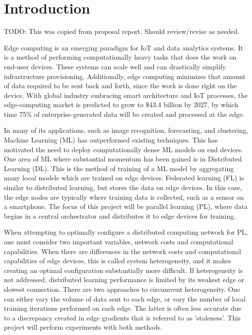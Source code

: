 \documentclass[../mthe-493-final-project.tex]{subfiles}
\begin{document}
    \chapter{Introduction}
    \label{ch:introduction}

    TODO: This was copied from proposal report. Should review/revise as needed.

    Edge computing is an emerging paradigm for IoT and data analytics systems. It is a method of performing computationally heavy tasks that does the work on end-user devices. These systems can scale well and can drastically simplify infrastructure provisioning. Additionally, edge computing minimizes that amount of data required to be sent back and forth, since the work is done right on the device. With global industry embracing smart architecture and IoT processes, the edge-computing market is predicted to grow to \$43.4 billion by 2027, by which time 75\% of enterprise-generated data will be created and processed at the edge.~\cite{noauthor_edge_2020}

    In many of its applications, such as image recognition, forecasting, and clustering, Machine Learning (ML) has outperformed existing techniques. This has motivated the need to deploy computationally dense ML models on end devices. One area of ML where substantial momentum has been gained is in Distributed Learning (DL). This is the method of training of a ML model by aggregating many local models which are trained on edge devices. Federated learning (FL) is similar to distributed learning, but stores the data on edge devices. In this case, the edge nodes are typically where training data is collected, such as a sensor on a smartphone. The focus of this project will be parallel learning (PL), where data begins in a central orchestrator and distributes it to edge devices for training.

    When attempting to optimally configure a distributed computing network for PL, one must consider two important variables, network costs and computational capabilities. When there are differences in the network costs and computational capabilities of edge devices, this is called system heterogeneity, and it makes creating an optimal configuration substantially more difficult. If heterogeneity is not addressed, distributed learning performance is limited by its weakest edge or slowest connection. There are two approaches to circumvent heterogeneity. One can either vary the volume of data sent to each edge, or vary the number of local training iterations performed on each edge. The latter is often less accurate due to a discrepancy created in edge gradients that is referred to as 'staleness'. This project will perform experiments with both methods.
    
\end{document}
